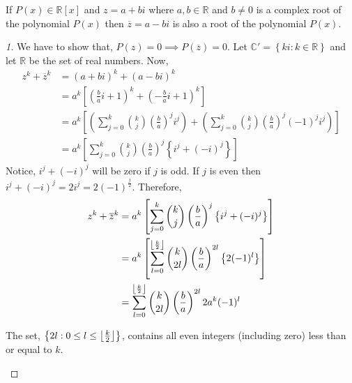 \begin{theorem}
    If $P(x) \in \mathbb{R}[x]$ and $z=a+bi$ where $a,b \in \mathbb{R}$ and $b\neq 0$ is a complex root of the polynomial 
    $P(x)$ then $\overline{z}=a-bi$ is also a root of the polynomial $P(x)$.
\end{theorem}
\begin{proof}[1]
    We have to show that, $P(z)=0 \implies P(\overline{z})=0$. Let $\mathbb{C}'=\left\{ki:k\in\mathbb{R}\right\}$ and let 
    $\mathbb{R}$ be the set of real numbers. Now,
    \begin{align*}
        z^{k} + \overline{z}^{k} &= (a+bi)^{k} + (a-bi)^{k} \\
                                 &= a^{k}\left[\left(\frac{b}{a}i + 1\right)^{k} + \left(-\frac{b}{a}i + 1\right)^{k} \right] \\
                                 &= a^{k}
                                 \left[ \left( \sum_{j=0}^{k} {k \choose j} \left(\frac{b}{a}\right)^{j}i^{j}\right) +
                                 \left( \sum_{j=0}^{k} {k \choose j} \left(\frac{b}{a}\right)^{j}(-1)^{j}i^{j} \right)\right] \\
                                 &= a^{k}
                                 \left[\sum_{j=0}^{k} {k \choose j}\left(\frac{b}{a}\right)^{j} \left\{i^{j} + (-i)^{j} 
                                 \right\} \right]
    \end{align*}
    Notice, $i^{j} + (-i)^{j}$ will be zero if $j$ is odd. If $j$ is even then $i^{j} + (-i)^{j} = 2i^{j} = 2(-1)^{\frac{j}{2}}$. 
    Therefore,
    \begin{align*}
        z^{k} + \overline{z}^{k} &= a^{k}
                                 \left[\sum_{j=0}^{k} {k \choose j}\left(\frac{b}{a}\right)^{j} \left\{i^{j} + (-i)^{j} 
                                 \right\} \right] \\
                                 &= a^{k} \left[\sum_{l=0}^{\left\lfloor \frac{k}{2} \right\rfloor} {k \choose 2l}\left(\frac{b}{a}\right)^{2l}
                                 \left\{2(-1)^{l}\right\}\right] \\
                                 &= \sum_{l=0}^{\left\lfloor \frac{k}{2} \right\rfloor} {k \choose 2l}\left(\frac{b}{a}\right)^{2l} 2a^{k}(-1)^{l}
    \end{align*}
    \begin{remark}
        The set, $\left\{ 2l : 0 \leq l \leq \left\lfloor \frac{k}{2} \right\rfloor\right\}$, contains all even integers (including zero) less than 
        or equal to $k$.
    \end{remark}

\end{proof}
